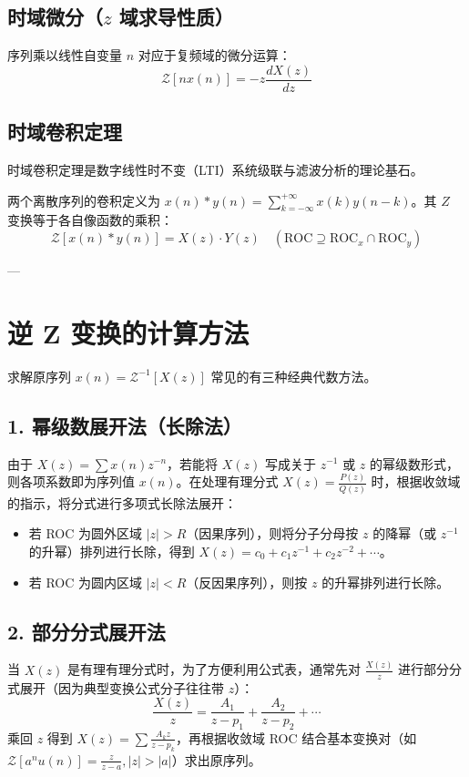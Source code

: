 \subsection{时域微分（$z$ 域求导性质）}
\begin{tcolorbox}[colback=teal!5!white, colframe=teal!75!black, title=定理 \thechapter.4 \quad $z$ 域求导性质]
	序列乘以线性自变量 $n$ 对应于复频域的微分运算：
	$$ \mathcal{Z}[n x(n)] = -z \frac{dX(z)}{dz} $$
\end{tcolorbox}

\subsection{时域卷积定理}
时域卷积定理是数字线性时不变（LTI）系统级联与滤波分析的理论基石。
\begin{tcolorbox}[colback=teal!5!white, colframe=teal!75!black, title=定理 \thechapter.5 \quad 时域卷积定理]
	两个离散序列的卷积定义为 $x(n) * y(n) = \sum_{k=-\infty}^{+\infty} x(k)y(n-k)$。其 $Z$ 变换等于各自像函数的乘积：
	$$ \mathcal{Z}[x(n) * y(n)] = X(z) \cdot Y(z) \quad (\text{ROC} \supseteq \text{ROC}_x \cap \text{ROC}_y) $$
\end{tcolorbox}

---

\section{逆 Z 变换的计算方法}

求解原序列 $x(n) = \mathcal{Z}^{-1}[X(z)]$ 常见的有三种经典代数方法。

\subsection{1. 幂级数展开法（长除法）}
由于 $X(z) = \sum x(n)z^{-n}$，若能将 $X(z)$ 写成关于 $z^{-1}$ 或 $z$ 的幂级数形式，则各项系数即为序列值 $x(n)$。在处理有理分式 $X(z) = \frac{P(z)}{Q(z)}$ 时，根据收敛域的指示，将分式进行多项式长除法展开：
\begin{itemize}
	\item 若 ROC 为圆外区域 $|z| > R$（因果序列），则将分子分母按 $z$ 的降幂（或 $z^{-1}$ 的升幂）排列进行长除，得到 $X(z) = c_0 + c_1 z^{-1} + c_2 z^{-2} + \cdots$。
	\item 若 ROC 为圆内区域 $|z| < R$（反因果序列），则按 $z$ 的升幂排列进行长除。
\end{itemize}

\subsection{2. 部分分式展开法}
当 $X(z)$ 是有理有理分式时，为了方便利用公式表，通常先对 $\frac{X(z)}{z}$ 进行部分分式展开（因为典型变换公式分子往往带 $z$）：
$$ \frac{X(z)}{z} = \frac{A_1}{z - p_1} + \frac{A_2}{z - p_2} + \cdots $$
乘回 $z$ 得到 $X(z) = \sum \frac{A_k z}{z - p_k}$，再根据收敛域 ROC 结合基本变换对（如 $\mathcal{Z}[a^n u(n)] = \frac{z}{z-a}, |z|>|a|$）求出原序列。

